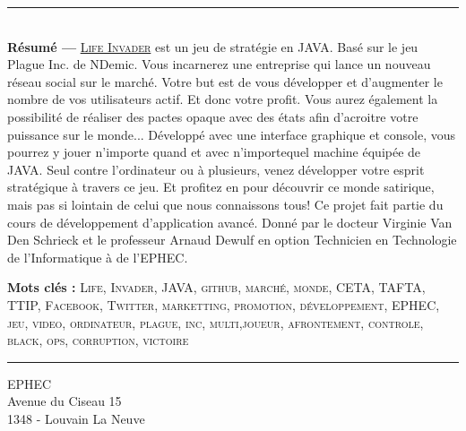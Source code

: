 \documentclass[a4paper,12pt, oneside]{book}
\makeatletter
\def\cleardoublepage{\clearpage\if@twoside \ifodd\c@page\else%
  \hbox{}%
  \thispagestyle{empty}%
  \newpage%
  \if@twocolumn\hbox{}\newpage\fi\fi\fi}
\theoremstyle{break}
\makeatother
\begin{document}

\mainmatter
\pagestyle{fancy}

\cleardoublepage










\appendix


%

\clearpage


\thispagestyle{empty}

\vspace*{\fill}
\noindent\rule[2pt]{\textwidth}{0.5pt}\\
{\textbf{Résumé ---}}
\underline{\textsc{Life Invader}} est un jeu de stratégie en JAVA. Basé sur le jeu Plague Inc. de NDemic. Vous incarnerez une entreprise qui lance un nouveau réseau social sur le marché. Votre but est de vous développer et d'augmenter le nombre de vos utilisateurs actif. Et donc votre profit. Vous aurez également la possibilité de réaliser des pactes opaque avec des états afin d'acroitre votre puissance sur le monde... Développé avec une interface graphique et console, vous pourrez y jouer n'importe quand et avec n'importequel machine équipée de JAVA. Seul contre l'ordinateur ou à plusieurs, venez développer votre esprit stratégique à travers ce jeu. Et profitez en pour découvrir ce monde satirique, mais pas si lointain de celui que nous connaissons tous! Ce projet fait partie du cours de développement d'application avancé. Donné par le docteur Virginie Van Den Schrieck et le professeur Arnaud Dewulf en option Technicien en Technologie de l'Informatique à de l'EPHEC.

{\textbf{Mots clés :}}
\textsc{Life, Invader, JAVA, github, marché, monde, CETA, TAFTA, TTIP, Facebook, Twitter, marketting, promotion, développement, EPHEC, jeu, video, ordinateur, plague, inc, multi,joueur, afrontement, controle, black, ops, corruption, victoire}
\\
\noindent\rule[2pt]{\textwidth}{0.5pt}
\begin{center}
  EPHEC\\
  Avenue du Ciseau 15\\
  1348 - Louvain La Neuve\\
\end{center}
\vspace*{\fill}
\end{document}
